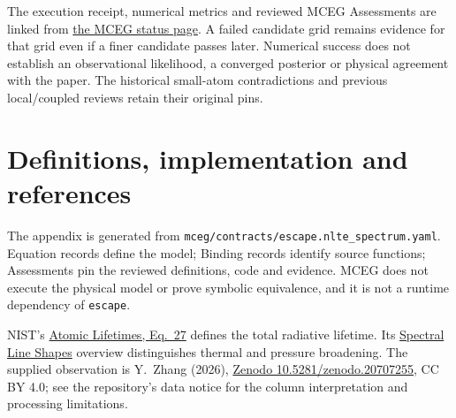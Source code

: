 \documentclass[10pt,a4paper]{article}
\begin{document}
The execution receipt, numerical metrics and reviewed MCEG Assessments are
linked from \href{../mceg/README.md}{the MCEG status page}. A failed candidate
grid remains evidence for that grid even if a finer candidate passes later.
Numerical success does not establish an observational likelihood, a converged
posterior or physical agreement with the paper. The historical small-atom
contradictions and previous local/coupled reviews retain their original pins.

\section{Definitions, implementation and references}
The appendix is generated from
\texttt{mceg/contracts/escape.nlte\_spectrum.yaml}. Equation records define the
model; Binding records identify source functions; Assessments pin the reviewed
definitions, code and evidence. MCEG does not execute the physical model or
prove symbolic equivalence, and it is not a runtime dependency of \texttt{escape}.

NIST's \href{https://physics.nist.gov/Pubs/AtSpec/node18.html}{Atomic Lifetimes,
Eq.~27} defines the total radiative lifetime. Its
\href{https://physics.nist.gov/Pubs/AtSpec/node20.html}{Spectral Line Shapes}
overview distinguishes thermal and pressure broadening. The supplied observation
is Y.~Zhang (2026), \href{https://doi.org/10.5281/zenodo.20707255}{Zenodo
10.5281/zenodo.20707255}, CC BY 4.0; see the repository's data notice for the
column interpretation and processing limitations.

\clearpage
\appendix

\end{document}
